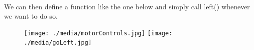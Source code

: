 \documentclass[final,3p,times]{article}
\begin{document}
\begin{figure}[!tbp]
  \centering
  \hfill
\end{figure}
\\
We can then define a function like the one below and simply call left() whenever we want to do so.
\begin{figure}[!h]
\texttt{[image: ./media/motorControls.jpg]}
\texttt{[image: ./media/goLeft.jpg]}
\end{figure}
\end{document}
